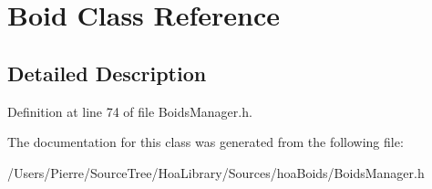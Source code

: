 \hypertarget{class_boid}{\section{Boid Class Reference}
\label{class_boid}
}


\subsection{Detailed Description}


Definition at line 74 of file Boids\-Manager.\-h.



The documentation for this class was generated from the following file\-:\begin{DoxyCompactItemize}
\item 
/\-Users/\-Pierre/\-Source\-Tree/\-Hoa\-Library/\-Sources/hoa\-Boids/Boids\-Manager.\-h\end{DoxyCompactItemize}
